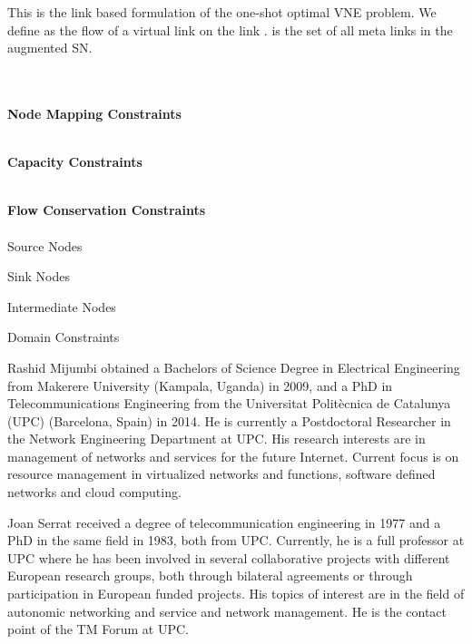 \documentclass[journal]{IEEEtran}
\begin{document}
\appendix[ViNEOPT]
This is the link based formulation of the one-shot optimal \ac{VNE} problem. We define  as the flow of a virtual link  on the link .  is the set of all meta links in the augmented \ac{SN}.

\\\\
\textbf{Node Mapping Constraints}



\\
\textbf{Capacity Constraints}

\\
\textbf{Flow Conservation Constraints}\\\\
Source Nodes

Sink Nodes

Intermediate Nodes

Domain Constraints









\newpage
\begin{IEEEbiography}
{Rashid Mijumbi}
obtained a Bachelors of Science Degree in Electrical Engineering from Makerere University (Kampala, Uganda) in 2009, and a PhD in Telecommunications Engineering from the Universitat Polit\`{e}cnica de Catalunya (UPC) (Barcelona, Spain) in 2014. He is currently a Postdoctoral Researcher in the Network Engineering Department at UPC. His research interests are in management of networks and services for the future Internet. Current focus is on resource management in virtualized networks and functions, software defined networks and cloud computing.
\end{IEEEbiography}

\begin{IEEEbiography}
{Joan Serrat}
received a degree of telecommunication engineering in 1977 and a PhD in the same field in 1983, both from UPC. Currently, he is a full professor at UPC where he has been involved in several collaborative projects with different European research groups, both through bilateral agreements or through participation in European funded projects. His topics of interest are in the field of autonomic networking and service and network management. He is the contact point of the TM Forum at UPC.
\end{IEEEbiography}
\end{document}
